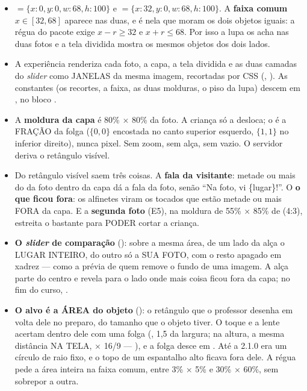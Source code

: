 \begin{itemize}
  \item {} $= \{x{:}0, y{:}0, w{:}68, h{:}100\}$ e  $=
    \{x{:}32, y{:}0, w{:}68, h{:}100\}$. A \textbf{faixa comum}
    $x \in [32, 68]$ aparece nas duas, e é nela que moram os dois objetos
    iguais: a régua do pacote exige $x - r \geq 32$ e $x + r \leq 68$. Por
    isso a lupa os acha nas duas fotos e a tela dividida mostra os mesmos
    objetos dos dois lados.
  \item A experiência renderiza cada foto, a capa, a tela dividida e as duas
    camadas do \emph{slider} como JANELAS da mesma imagem, recortadas por CSS
    (, ). As constantes
    (os recortes, a faixa, as duas molduras, o piso da lupa) descem em
    , no bloco .
  \item A \textbf{moldura da capa} é 80\% $\times$ 80\% da foto. A criança só
    a desloca; o  é a FRAÇÃO da folga ($\{0,0\}$ encostada
    no canto superior esquerdo, $\{1,1\}$ no inferior direito), nunca pixel.
    Sem zoom, sem alça, sem vazio. O servidor deriva o retângulo visível.
  \item Do retângulo visível saem três coisas. A \textbf{fala da visitante}:
    metade ou mais do  da foto dentro da capa dá a fala da foto,
    senão \enquote{Na foto, vi \{lugar\}!}. O \textbf{o que ficou fora}: os
    alfinetes viram os  tocados que estão metade ou mais FORA
    da capa. E a \textbf{segunda foto} (E5), na moldura de 55\% $\times$ 85\%
    de  (4:3), estreita o bastante para PODER cortar
    a criança.
  \item \textbf{O \emph{slider} de comparação} (): sobre a
    mesma área, de um lado da alça o LUGAR INTEIRO, do outro só a SUA FOTO,
    com o resto apagado em xadrez --- como a prévia de quem remove o fundo de
    uma imagem. A alça parte do centro e revela para o lado onde mais coisa
    ficou fora da capa; no fim do curso, .
  \item \textbf{O alvo é a ÁREA do objeto} (): o retângulo que
    o professor desenha em volta dele no preparo, do tamanho que o objeto
    tiver. O toque e a lente acertam dentro dele com uma folga
    (, 1,5 da largura; na altura, a mesma distância NA
    TELA, $\times$ 16/9 --- ), e a folga desce em
    . Até a 2.1.0 era um círculo de raio fixo, e
    o topo de um espantalho alto ficava fora dele. A régua pede a área inteira
    na faixa comum, entre 3\% $\times$ 5\% e 30\% $\times$ 60\%, sem
    sobrepor a outra.
\end{itemize}

